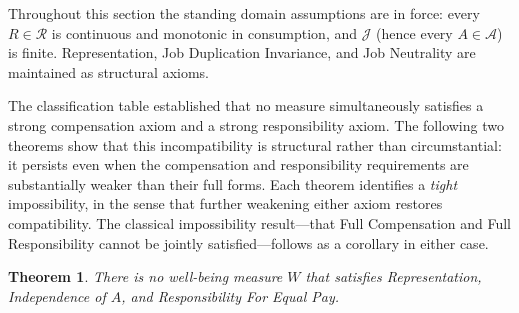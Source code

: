 \documentclass[12pt,thmsb]{article}
\newtheorem{theorem}{Theorem}
\begin{document}
Throughout this section the standing domain assumptions are in force: every
$R\in\mathcal R$ is continuous and monotonic in consumption, and $\mathcal J$
(hence every $A\in\mathcal A$) is finite. Representation, Job Duplication
Invariance, and Job Neutrality are maintained as structural axioms.

The classification table established that no measure simultaneously satisfies a
strong compensation axiom and a strong responsibility axiom. The following two
theorems show that this incompatibility is structural rather than
circumstantial: it persists even when the compensation and responsibility
requirements are substantially weaker than their full forms. Each theorem
identifies a \emph{tight} impossibility, in the sense that further weakening
either axiom restores compatibility. The classical impossibility
result---that Full Compensation and Full Responsibility cannot be jointly
satisfied---follows as a corollary in either case.


\begin{theorem}
\label{thm:imp1}
There is no well-being measure $W$ that satisfies Representation, Independence
of $A$, and Responsibility For Equal Pay.
\end{theorem}
\end{document}
